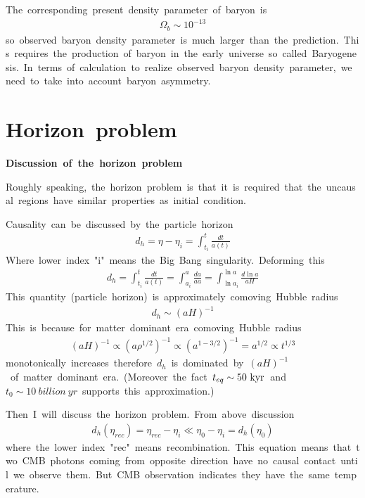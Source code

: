 The\ corresponding\ present\ density\ parameter\ of\ baryon\ is
\begin{align*}
    \Omega_b\sim10^{-13}
\end{align*}
so\ observed\ baryon\ density\ parameter\ is\ much\ larger\ than\ the\ prediction.\ This\ requires\ the\ production\ of\ baryon\ in\ the\ early\ universe\ so\ called\ Baryogenesis.\ In\ terms\ of\ calculation\ to\ realize\ observed\ baryon\ density\ parameter,\ we\ need\ to\ take\ into\ account\ baryon\ asymmetry.

\section{Horizon\ problem}
\textbf{Discussion\ of\ the\ horizon\ problem}

Roughly\ speaking,\ the\ horizon\ problem\ is\ that\ it\ is\ required\ that\ the\ uncausal\ regions\ have\ similar\ properties\ as\ initial\ condition.

Causality\ can\ be\ discussed\ by\ the\ particle\ horizon
\begin{align*}
    d_h=\eta-\eta_i=\int^{t}_{t_i}\frac{dt}{a(t)}
\end{align*}
Where\ lower\ index\ "i"\ means\ the\ Big\ Bang\ singularity.\ Deforming\ this
\begin{align*}
    d_h=\int^{t}_{t_i}\frac{dt}{a(t)}=\int^a_{a_i}\frac{da}{a\Dot{a}}=\int^{\ln{a}}_{\ln{a_i}}\frac{d\ln{a}}{aH}
\end{align*}
This\ quantity\ (particle\ horizon)\ is\ approximately\ comoving\ Hubble\ radius
\begin{align*}
    d_h\sim(aH)^{-1}
\end{align*}
This\ is\ because\ for\ matter\ dominant\ era\ comoving\ Hubble\ radius
\begin{align*}
    (aH)^{-1}\propto(a\rho^{1/2})^{-1}\propto(a^{1-3/2})^{-1}=a^{1/2}\propto t^{{1/3}}
\end{align*}
monotonically\ increases\ therefore\ $d_h$\ is\ dominated\ by\ $(aH)^{-1}$\ of\ matter\ dominant\ era.\ (Moreover\ the\ fact\ $t_{eq}\sim50\ \rm{kyr}$\ and\ $t_0\sim10\ billion\ yr$\ supports\ this\ approximation.)

Then\ I\ will\ discuss\ the\ horizon\ problem.\ From\ above\ discussion
\begin{align}
    d_h(\eta_{rec})=\eta_{rec}-\eta_i\ll\eta_0-\eta_i=d_h(\eta_0)
\end{align}
where\ the\ lower\ index\ "rec"\ means\ recombination.\ This\ equation\ means\ that\ two\ CMB\ photons\ coming\ from\ opposite\ direction\ have\ no\ causal\ contact\ until\ we\ observe\ them.\ But\ CMB\ observation\ indicates\ they\ have\ the\ same\ temperature.

